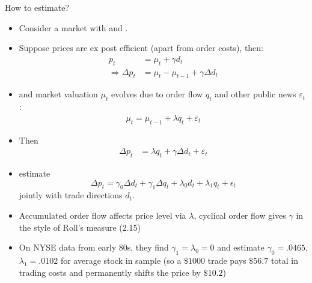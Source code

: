 \documentclass[english,10pt
,aspectratio=169
]{beamer}
\begin{document}
\begin{frame}{How to estimate?}
	\begin{itemize}
		\item Consider a market with  and .
		\item Suppose prices are ex post efficient (apart from order costs), then:
		\begin{align*}
			p_t &= \mu_t + \gamma d_t
			\\
			\Rightarrow \varDelta p_t &= \mu_t - \mu_{t-1} + \gamma \varDelta d_t
		\end{align*}
		\pause
		\item and market valuation $\mu_t$ evolves due to order flow $q_t$ and other public news $\varepsilon_t$:
		\begin{align*}
			\mu_t = \mu_{t-1} + \lambda q_t + \varepsilon_t
		\end{align*}
		\item Then
		\begin{align*}
			\varDelta p_t &= \lambda q_t + \gamma \varDelta d_t + \varepsilon_t
		\end{align*}
	\end{itemize}
\end{frame}


\begin{frame}{\cite{glosten_estimating_1988}}
	\begin{itemize}
		\item \textbf{\cite{glosten_estimating_1988}} estimate
		\begin{equation} \tag{5.7}
			\Delta p_t = \gamma_0 \Delta d_t+ \gamma_1 \Delta q_t + \lambda_0 d_t + \lambda_1 q_t + \epsilon_t
		\end{equation}
		jointly with trade directions $d_t$. 
		\item Accumulated order flow affects price level via $\lambda$, cyclical order flow gives $\gamma$ in the style of Roll's measure (2.15)
		\item On NYSE data from early 80s, they find $\gamma_1=\lambda_0=0$ and estimate $\gamma_0=.0465$, $\lambda_1=.0102$ for average stock in sample
		(so a $\$1000$ trade pays $\$56.7$ total in trading costs and permanently shifts the price by $\$10.2$)
	\end{itemize}
\end{frame}
\end{document}
